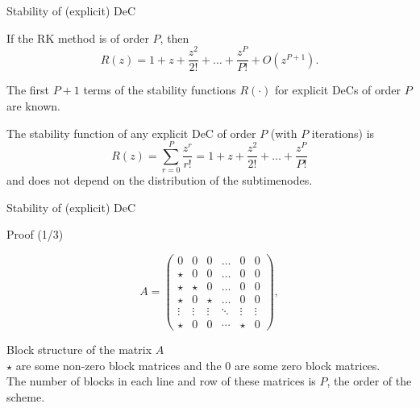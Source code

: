 \documentclass[9pt,compress,t,aspectratio=169]{beamer}
\begin{document}
\begin{frame}{Stability of (explicit) DeC}
	
\begin{theorem}\label{th:RK_stab_functions}
	If the RK method is of order $P$, then\begin{equation}\label{eq:RK_order}
		R(z) = 1 + z + \frac{z^2}{2!} +\dots +\frac{z^P}{P!}+O(z^{P+1}).
	\end{equation}
\end{theorem}

The first $P+1$ terms of the stability functions $R(\cdot)$ for explicit DeCs of order $P$ are known.
\begin{theorem}\label{th:bDeC_equivalence} 
	The stability function of any explicit DeC of order $P$ (with $P$ iterations) is
	\begin{equation}
		R(z) = \sum_{r=0}^{P} \frac{z^r}{r!}= 1 + z + \frac{z^2}{2!} +\dots +\frac{z^P}{P!}
	\end{equation}
	and does not depend on the distribution of the subtimenodes.
\end{theorem}  
\end{frame}


\begin{frame}{Stability of (explicit) DeC}
	\begin{block}{Proof (1/3)}
				\begin{minipage}{0.4\textwidth}
			\begin{equation*}
			A= \begin{pmatrix}
				0 & 0 & 0&  \dots &0 &0\\
				\star & 0 & 0&  \dots & 0 &0\\
				\star & \star & 0 & \dots & 0 &0\\
				\star & 0& \star  & \dots & 0 &0\\
				\vdots & \vdots & \vdots &\ddots &\vdots&\vdots \\
				\star & 0 & 0 &\cdots   &\star &0
			\end{pmatrix},
		\end{equation*}
	\end{minipage}
	\begin{minipage}{0.55\textwidth}
		Block structure of the matrix $A$\\
		$\star$ are some non-zero block matrices and the 0 are some zero block matrices.\\
		The number of blocks in each line and row of these matrices is $P$, the order of the scheme.
	\end{minipage}
\end{block}

\end{frame}
\end{document}
